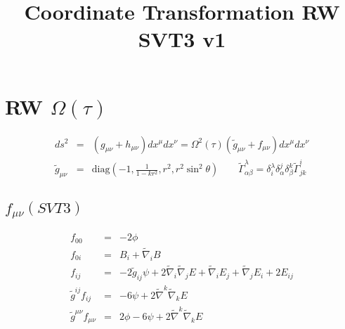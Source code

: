 \documentclass[10pt,letterpaper]{article}
\title{Coordinate Transformation RW SVT3 v1}
\date{}
\numberwithin{equation}{section}
\begin{document}
 
\maketitle
\noindent 
\section{RW $\Omega(\tau)$}
\begin{eqnarray}
ds^2 &=& (g_{\mu\nu} + h_{\mu\nu})dx^\mu dx^\nu = \Omega^2(\tau)(\tilde g_{\mu\nu} + f_{\mu\nu})dx^\mu dx^\nu
\\
\tilde g_{\mu\nu} &=& \text{diag}\left(-1,\frac{1}{1-kr^2},r^2,r^2\sin^2\theta\right)\qquad \tilde \Gamma^{\lambda}_{\alpha\beta} = \delta^\lambda_i \delta^j_\alpha \delta^k_\beta \tilde \Gamma^{i}_{jk}
\end{eqnarray}
%
\subsection{$f_{\mu\nu}(SVT3)$}
\begin{eqnarray}
f_{00} &=& -2\phi
\nonumber\\
f_{0i} &=& B_i + \tilde\nabla_i B
\nonumber\\
f_{ij} &=& -2\tilde g_{ij} \psi + 2\tilde\nabla_i\tilde\nabla_j E + \tilde\nabla_i E_j + \tilde\nabla_j E_i + 2E_{ij}
\nonumber\\
\tilde g^{ij} f_{ij} &=& -6\psi + 2\tilde\nabla^k\tilde\nabla_k E
\nonumber\\
\tilde g^{\mu\nu} f_{\mu\nu} &=& 2\phi-6\psi + 2\tilde\nabla^k\tilde\nabla_k E
\end{eqnarray}
%
\end{document}
